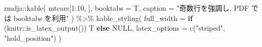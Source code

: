 \documentclass[
]{bxjsbook}
\newenvironment{Shaded}{\begin{snugshade}}{\end{snugshade}}
\newcommand{\AttributeTok}[1]{\textcolor[rgb]{0.77,0.63,0.00}{#1}}
\newcommand{\ConstantTok}[1]{\textcolor[rgb]{0.00,0.00,0.00}{#1}}
\newcommand{\ControlFlowTok}[1]{\textcolor[rgb]{0.13,0.29,0.53}{\textbf{#1}}}
\newcommand{\DecValTok}[1]{\textcolor[rgb]{0.00,0.00,0.81}{#1}}
\newcommand{\FunctionTok}[1]{\textcolor[rgb]{0.00,0.00,0.00}{#1}}
\newcommand{\NormalTok}[1]{#1}
\newcommand{\SpecialCharTok}[1]{\textcolor[rgb]{0.00,0.00,0.00}{#1}}
\newcommand{\StringTok}[1]{\textcolor[rgb]{0.31,0.60,0.02}{#1}}
\theoremstyle{definition}
\theoremstyle{definition}
\theoremstyle{definition}
\theoremstyle{remark}
\begin{document}
\begin{Shaded}
\begin{Highlighting}[numbers=left,,]
\NormalTok{rmdja}\SpecialCharTok{::}\FunctionTok{kable}\NormalTok{(}
\NormalTok{  mtcars[}\DecValTok{1}\SpecialCharTok{:}\DecValTok{10}\NormalTok{, ],}
  \AttributeTok{booktabs =}\NormalTok{ T,}
  \AttributeTok{caption =} \StringTok{"奇数行を強調し, PDF では \textasciigrave{}booktabs\textasciigrave{} を利用"}
\NormalTok{) }\SpecialCharTok{\%\textgreater{}\%}
  \FunctionTok{kable\_styling}\NormalTok{(}
    \AttributeTok{full\_width =} \ControlFlowTok{if}\NormalTok{ (knitr}\SpecialCharTok{::}\FunctionTok{is\_latex\_output}\NormalTok{()) T }\ControlFlowTok{else} \ConstantTok{NULL}\NormalTok{,}
    \AttributeTok{latex\_options =} \FunctionTok{c}\NormalTok{(}\StringTok{"striped"}\NormalTok{, }\StringTok{"hold\_position"}\NormalTok{)}
\NormalTok{  )}
\end{Highlighting}
\end{Shaded}
\end{document}
